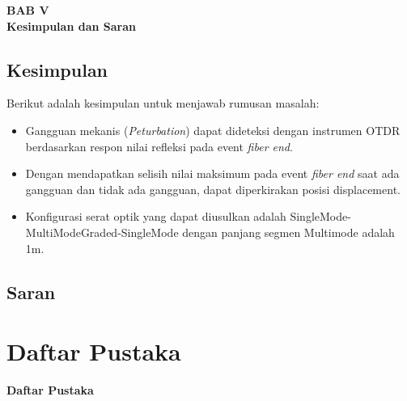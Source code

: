 \documentclass[12pt]{article}
\begin{document}
\begin{center}
	{\large \textbf{BAB V}} \\
	{\large \textbf{Kesimpulan dan Saran}}
\end{center}

\subsection{Kesimpulan}

Berikut adalah kesimpulan untuk menjawab rumusan masalah:

\begin{itemize}
	\item Gangguan mekanis (\textit{Peturbation}) dapat dideteksi dengan instrumen OTDR berdasarkan respon nilai refleksi pada event \textit{fiber end}.
	\item Dengan mendapatkan selisih nilai maksimum pada event \textit{fiber end} saat ada gangguan dan tidak ada gangguan, dapat diperkirakan posisi displacement.
	\item Konfigurasi serat optik yang dapat diusulkan adalah SingleMode-MultiModeGraded-SingleMode dengan panjang segmen Multimode adalah 1m.
\end{itemize}
	
\subsection{Saran}


\newpage
\thispagestyle{empty}
\mbox{}

\newpage
	\section{Daftar Pustaka}
	
	\begin{center}
		\textbf{Daftar Pustaka}
	\end{center}
	
	
	
	
\end{document}
